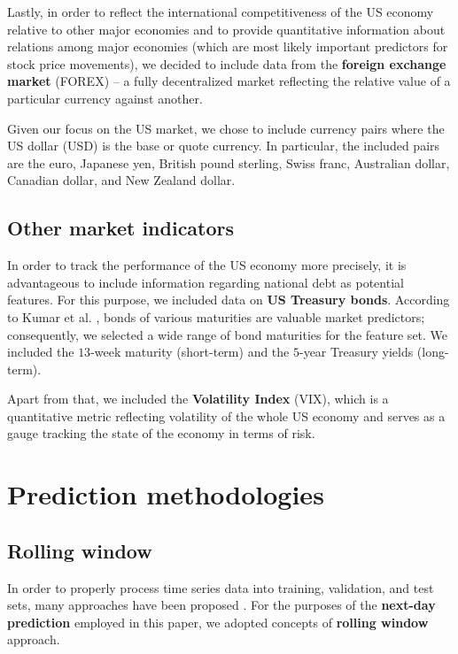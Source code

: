 \documentclass{svk_en}
\begin{document}
Lastly, in order to reflect the international competitiveness of the US economy relative to other major economies and to provide quantitative information about
relations among major economies (which are most likely important predictors for stock price movements),
we decided to include data from the \textbf{foreign exchange market} (FOREX) – a fully decentralized market reflecting the relative value of 
a particular currency against another.

Given our focus on the US market, we chose to include currency pairs where the US
dollar (USD) is the base or quote currency. In particular, the included pairs are the euro,
Japanese yen, British pound sterling, Swiss franc, Australian dollar, Canadian dollar, and New
Zealand dollar.

\subsection{Other market indicators}

In order to track the performance of the US economy more precisely, it is advantageous
to include information regarding national debt as potential features. For this purpose,
we included data on \textbf{US Treasury bonds}. According to Kumar et al. \cite{clanok6}, bonds of various 
maturities are valuable market predictors; consequently, we selected a wide range of bond maturities for the feature set.
We included the $13$-week maturity (short-term) and the $5$-year Treasury yields (long-term).

Apart from that, we included the \textbf{Volatility Index} (VIX), which is a quantitative metric reflecting volatility of the whole US economy
and serves as a gauge tracking the state of the economy in terms of risk.

\section{Prediction methodologies}
\label{sec:pm}

\subsection{Rolling window}

In order to properly process time series data into training, validation, and test sets, many approaches have been proposed \cite{forecast_book}.
For the purposes of the \textbf{next-day prediction} employed in this paper, we adopted concepts of \textbf{rolling window} approach. 
\end{document}

